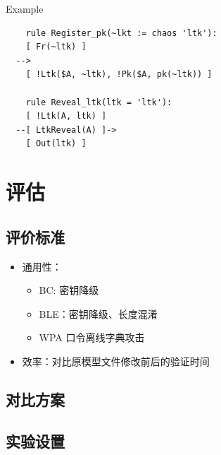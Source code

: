 \documentclass[UTF8]{ctexart}
\begin{document}


Example

\begin{lstlisting}
    rule Register_pk(~lkt := chaos 'ltk'):
    [ Fr(~ltk) ]
  -->
    [ !Ltk($A, ~ltk), !Pk($A, pk(~ltk)) ] 

    rule Reveal_ltk(ltk = 'ltk'):
    [ !Ltk(A, ltk) ]
  --[ LtkReveal(A) ]->
    [ Out(ltk) ]

\end{lstlisting}


\section{评估}
\subsection{评价标准}

\begin{itemize}
    \item 通用性：
        \begin{itemize}
            \item BC: 密钥降级
            \item BLE：密钥降级、长度混淆
            \item WPA 口令离线字典攻击
        \end{itemize}
    \item 效率：对比原模型文件修改前后的验证时间
\end{itemize}

    

\subsection{对比方案}

\subsection{实验设置}



\end{document}
